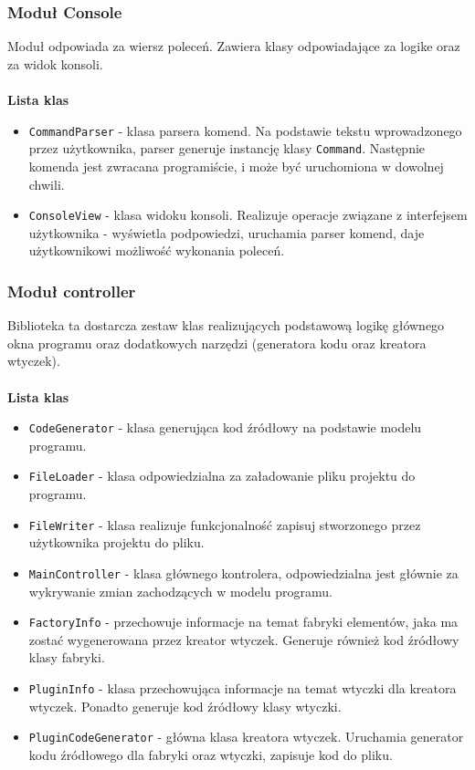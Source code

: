 \documentclass[12pt]{article}
\begin{document}
\subsubsection{Moduł Console}
Moduł odpowiada za wiersz poleceń. Zawiera klasy odpowiadające za logike oraz za widok konsoli. 
\cleardoublepage
\paragraph{}
\textbf{Lista klas}
\vspace{-2mm}
\begin{itemize}
  \setlength{\itemsep}{0em}
\item \texttt{CommandParser} - klasa parsera komend. Na podstawie tekstu wprowadzonego przez użytkownika, parser generuje instancję klasy \texttt{Command}. Następnie komenda jest zwracana programiście, i może być uruchomiona w dowolnej chwili.
\item \texttt{ConsoleView} - klasa widoku konsoli. Realizuje operacje związane z interfejsem użytkownika - wyświetla podpowiedzi, uruchamia parser komend, daje użytkownikowi możliwość wykonania poleceń.
\end{itemize}
\subsubsection{Moduł controller}
Biblioteka ta dostarcza zestaw klas realizujących podstawową logikę głównego okna programu oraz dodatkowych narzędzi (generatora kodu oraz kreatora wtyczek). 
\paragraph{}
\textbf{Lista klas}
\vspace{-2mm}
\begin{itemize}
  \setlength{\itemsep}{0em}
\item \texttt{CodeGenerator} - klasa generująca kod źródłowy na podstawie modelu programu.
\item \texttt{FileLoader} - klasa odpowiedzialna za załadowanie pliku projektu do programu.
\item \texttt{FileWriter} - klasa realizuje funkcjonalność zapisuj stworzonego przez użytkownika projektu do pliku.
\item \texttt{MainController} - klasa głównego kontrolera, odpowiedzialna jest głównie za wykrywanie zmian zachodzących w modelu programu.
\item \texttt{FactoryInfo} - przechowuje informacje na temat fabryki elementów, jaka ma zostać wygenerowana przez kreator wtyczek. Generuje również kod źródłowy klasy fabryki.
\item \texttt{PluginInfo} - klasa przechowująca informacje na temat wtyczki dla kreatora wtyczek. Ponadto generuje kod źródłowy klasy wtyczki.
\item \texttt{PluginCodeGenerator} - główna klasa kreatora wtyczek. Uruchamia generator kodu źródłowego dla fabryki oraz wtyczki, zapisuje kod do pliku.
\end{itemize}
\end{document}
